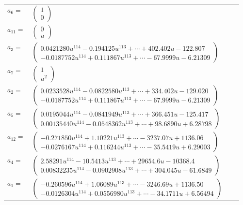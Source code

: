 \documentclass[1p]{elsarticle_modified}
\theoremstyle{definition}
\begin{document}
\begin{tabular}{m{7pt} m{180pt} m{7pt} m{180pt} }
\flushright $a_{6}=$&$\begin{pmatrix}1\\0\end{pmatrix}$ \\
\flushright $a_{11}=$&$\begin{pmatrix}0\\u\end{pmatrix}$ \\
\flushright $a_{3}=$&$\begin{pmatrix}0.0421280 u^{114}-0.194125 u^{113}+\cdots+402.402 u-122.807\\-0.0187752 u^{114}+0.111867 u^{113}+\cdots-67.9999 u-6.21309\end{pmatrix}$ \\
\flushright $a_{7}=$&$\begin{pmatrix}1\\u^2\end{pmatrix}$ \\
\flushright $a_{2}=$&$\begin{pmatrix}0.0233528 u^{114}-0.0822580 u^{113}+\cdots+334.402 u-129.020\\-0.0187752 u^{114}+0.111867 u^{113}+\cdots-67.9999 u-6.21309\end{pmatrix}$ \\
\flushright $a_{5}=$&$\begin{pmatrix}0.0195044 u^{114}-0.0841949 u^{113}+\cdots+366.451 u-125.417\\0.00135440 u^{114}-0.0548362 u^{113}+\cdots+98.6890 u+6.28798\end{pmatrix}$ \\
\flushright $a_{12}=$&$\begin{pmatrix}-0.271850 u^{114}+1.10221 u^{113}+\cdots-3237.07 u+1136.06\\-0.0276167 u^{114}+0.116244 u^{113}+\cdots-35.5419 u+6.29003\end{pmatrix}$ \\
\flushright $a_{4}=$&$\begin{pmatrix}2.58291 u^{114}-10.5413 u^{113}+\cdots+29654.6 u-10368.4\\0.00832235 u^{114}-0.0902908 u^{113}+\cdots+304.045 u-61.6849\end{pmatrix}$ \\
\flushright $a_{1}=$&$\begin{pmatrix}-0.260596 u^{114}+1.06089 u^{113}+\cdots-3246.69 u+1136.50\\-0.0126304 u^{114}+0.0556980 u^{113}+\cdots-34.1711 u+6.56494\end{pmatrix}$ \\

\end{tabular}
\end{document}
